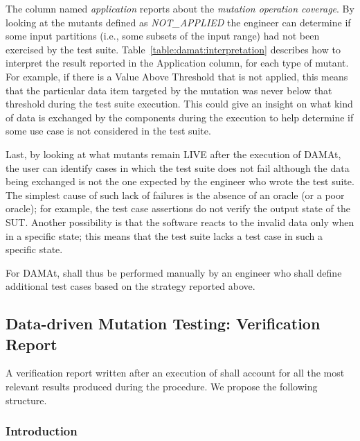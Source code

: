 The column named \emph{application} reports about the \emph{mutation operation coverage}. By looking at the mutants defined as \emph{NOT\_APPLIED} the engineer can determine if some input partitions (i.e., some subsets of the input range) had not been exercised by the test suite. Table~\ref{table:damat:interpretation} describes how to interpret the result reported in the Application column, for each type of mutant.
For example, if there is a Value Above Threshold that is not applied, this means that the particular data item targeted by the mutation was never below that threshold during the test suite execution.
This could give an insight on what kind of data is exchanged by the components during the execution to help determine if some use case is not considered in the test suite.


Last, by looking at what mutants remain LIVE after the execution of DAMAt, the user can identify cases in which the test suite does not fail although the data being exchanged is not the one expected by the engineer who wrote the test suite.
The simplest cause of such lack of failures is the absence of an oracle (or a poor oracle); for example, the test case assertions do not verify the output state of the SUT.
Another possibility is that the software reacts to the invalid data only when in a specific state; this means that the test suite lacks a test case in such a specific state.

For DAMAt,  shall thus be performed manually by an engineer who shall define additional test cases based on the strategy reported above.




\STARTCHANGEDFINAL
\subsection{Data-driven Mutation Testing: Verification Report}
A verification report written after an execution of \DAMA shall account for all the most relevant results produced during the procedure. We propose the following structure.

  \subsubsection{Introduction}


